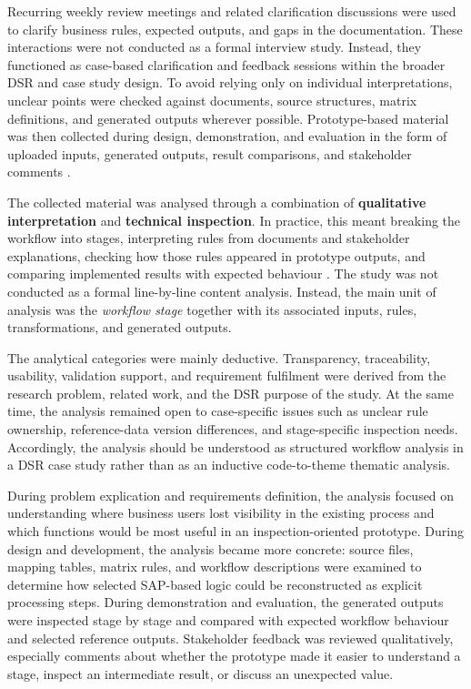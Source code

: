 Recurring weekly review meetings and related clarification discussions were used to clarify business rules, expected outputs, and gaps in the documentation. These interactions were not conducted as a formal interview study. Instead, they functioned as case-based clarification and feedback sessions within the broader DSR and case study design. To avoid relying only on individual interpretations, unclear points were checked against documents, source structures, matrix definitions, and generated outputs wherever possible. Prototype-based material was then collected during design, demonstration, and evaluation in the form of uploaded inputs, generated outputs, result comparisons, and stakeholder comments \cite{runeson2009guidelines}.






The collected material was analysed through a combination of \textbf{qualitative interpretation} and \textbf{technical inspection}. In practice, this meant breaking the workflow into stages, interpreting rules from documents and stakeholder explanations, checking how those rules appeared in prototype outputs, and comparing implemented results with expected behaviour \cite{johannesson2021,hevner2004design}. The study was not conducted as a formal line-by-line content analysis. Instead, the main unit of analysis was the \textit{workflow stage} together with its associated inputs, rules, transformations, and generated outputs.

The analytical categories were mainly deductive. Transparency, traceability, usability, validation support, and requirement fulfilment were derived from the research problem, related work, and the DSR purpose of the study. At the same time, the analysis remained open to case-specific issues such as unclear rule ownership, reference-data version differences, and stage-specific inspection needs. Accordingly, the analysis should be understood as structured workflow analysis in a DSR case study rather than as an inductive code-to-theme thematic analysis.

During problem explication and requirements definition, the analysis focused on understanding where business users lost visibility in the existing process and which functions would be most useful in an inspection-oriented prototype. During design and development, the analysis became more concrete: source files, mapping tables, matrix rules, and workflow descriptions were examined to determine how selected SAP-based logic could be reconstructed as explicit processing steps. During demonstration and evaluation, the generated outputs were inspected stage by stage and compared with expected workflow behaviour and selected reference outputs. Stakeholder feedback was reviewed qualitatively, especially comments about whether the prototype made it easier to understand a stage, inspect an intermediate result, or discuss an unexpected value.







